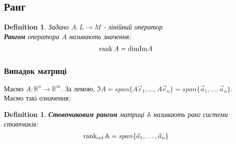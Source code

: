 \documentclass[a4paper, 10pt]{article}
\theoremstyle{theoremdd}
\newtheorem{definition}[theorem]{Definition}
\begin{document}
\iffalse
Час повернутись до формули $\det (\mathbb{A} \mathbb{B}) = \det \mathbb{A} \det \mathbb{B}$.\\
Розглянемо випадок, коли $\det \mathbb{B} = 0$\\
Тоді звідси $\{\vec{b}_1, \dots, \vec{b}_n\}$ - л.з., зокрема $\{\mathbb{A}\vec{b}_1, \dots, \mathbb{A} \vec{b}_n\}$ - л.з. $\implies \det \mathbb{A} \mathbb{B} = 0$\\
Тепер ця властивість є коректною.
\bigskip \\
Повернімось теперь до $\det \begin{pmatrix}
 \mathbb{A} & \vline & \mathbb{C} \\
 \hline
 \mathbb{O} & \vline & \mathbb{B}
\end{pmatrix} = \det \mathbb{A} \det \mathbb{B}$.\\
Знову нехай $\det \mathbb{B} = 0 \implies \det \mathbb{A} \mathbb{B} = 0$\\
Тоді звідси $\{ \vec{b}_1,\dots,\vec{b}_n \}$ - л.з. А оскільки $\det \mathbb{B} = \det \mathbb{B}^T$, то звідси $\{ \overleftarrow{b}_1,\dots,\overleftarrow{b}_n \}$ - система рядків матриці $\mathbb{B}$ - л.з.\\
А тому рядки блочно трикутної матриці - л.з. $\Rightarrow \det \begin{pmatrix}
 \mathbb{A} & \vline & \mathbb{C} \\
 \hline
 \mathbb{O} & \vline & \mathbb{B}
\end{pmatrix} = 0$.
\fi

\subsection{Ранг}
\begin{definition}
Задано $A: L \to M$ - лінійний оператор\\
\textbf{Рангом} оператора $A$ називають значення: 
\begin{align*}
\rank A = \textrm{dim} {\Im} A
\end{align*}
\iffalse
\textbf{Дефектом} оператора $A$ називають значення (нам це не потрібно):
\begin{align*}
\textrm{def } A = \dim{\ker A}
\end{align*}
\fi
\end{definition}

\subsubsection*{Випадок матриці}
Маємо $A: \mathbb{R}^n \to \mathbb{R}^m$. За лемою, $\Im A = span\{A\vec{e}_1,\dots, A\vec{e}_n\} = span\{\vec{a}_1,\dots,\vec{a}_n\}$. Маємо такі означення:
\begin{definition}
\textbf{Стовпчиковим рангом} матриці $\mathbb{A}$ називають ранг системи стовпчиків:
\begin{align*}
\rank_{\textrm{col}} \mathbb{A} = span\{\vec{a}_1,\dots,\vec{a}_n\}
\end{align*}
\end{definition}
\end{document}
